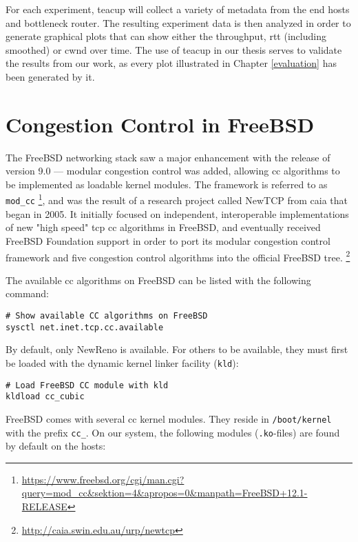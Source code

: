 For each experiment, \gls{teacup} will collect a variety of metadata from the end hosts and bottleneck router. The resulting experiment data is then analyzed in order to generate graphical plots that can show either the throughput, \gls{rtt} (including smoothed) or \gls{cwnd} over time. The use of \gls{teacup} in our thesis serves to validate the results from our work, as every plot illustrated in Chapter \ref{evaluation} has been generated by it.










\section{Congestion Control in FreeBSD} \label{sec:cc_in_freebsd}

The FreeBSD networking stack saw a major enhancement with the release of version 9.0 --- modular congestion control was added, allowing \gls{cc} algorithms to be implemented as loadable kernel modules. The framework is referred to as \lstinline{mod_cc} \footnote{\url{https://www.freebsd.org/cgi/man.cgi?query=mod_cc&sektion=4&apropos=0&manpath=FreeBSD+12.1-RELEASE}}, and was the result of a research project called NewTCP from \gls{caia} that began in 2005. It initially focused on independent, interoperable implementations of new "high speed" \gls{tcp} \gls{cc} algorithms in FreeBSD, and eventually received FreeBSD Foundation support in order to port its modular congestion control framework and five congestion control algorithms into the official FreeBSD tree. \footnote{\url{http://caia.swin.edu.au/urp/newtcp}}

The available \gls{cc} algorithms on FreeBSD can be listed with the following command:

\begin{verbatim}
# Show available CC algorithms on FreeBSD
sysctl net.inet.tcp.cc.available
\end{verbatim}
By default, only NewReno is available. For others to be available, they must first be loaded with the dynamic kernel linker facility (\lstinline{kld}):

\begin{verbatim}
# Load FreeBSD CC module with kld
kldload cc_cubic
\end{verbatim}
FreeBSD comes with several \gls{cc} kernel modules. They reside in \lstinline{/boot/kernel} with the prefix \lstinline{cc_}. On our system, the following modules (\lstinline{.ko}-files) are found by default on the hosts:

